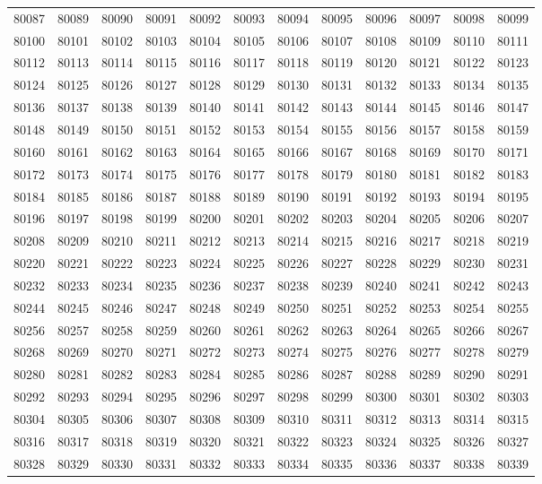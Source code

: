 \begin{center}
\begin{longtable}{llllllllllll}
80087 &80089 &80090 &80091 &80092 &80093 &80094 &80095 &80096 &80097 &80098 &80099 \\
80100 &80101 &80102 &80103 &80104 &80105 &80106 &80107 &80108 &80109 &80110 &80111 \\
80112 &80113 &80114 &80115 &80116 &80117 &80118 &80119 &80120 &80121 &80122 &80123 \\
80124 &80125 &80126 &80127 &80128 &80129 &80130 &80131 &80132 &80133 &80134 &80135 \\
80136 &80137 &80138 &80139 &80140 &80141 &80142 &80143 &80144 &80145 &80146 &80147 \\
80148 &80149 &80150 &80151 &80152 &80153 &80154 &80155 &80156 &80157 &80158 &80159 \\
80160 &80161 &80162 &80163 &80164 &80165 &80166 &80167 &80168 &80169 &80170 &80171 \\
80172 &80173 &80174 &80175 &80176 &80177 &80178 &80179 &80180 &80181 &80182 &80183 \\
80184 &80185 &80186 &80187 &80188 &80189 &80190 &80191 &80192 &80193 &80194 &80195 \\
80196 &80197 &80198 &80199 &80200 &80201 &80202 &80203 &80204 &80205 &80206 &80207 \\
80208 &80209 &80210 &80211 &80212 &80213 &80214 &80215 &80216 &80217 &80218 &80219 \\
80220 &80221 &80222 &80223 &80224 &80225 &80226 &80227 &80228 &80229 &80230 &80231 \\
80232 &80233 &80234 &80235 &80236 &80237 &80238 &80239 &80240 &80241 &80242 &80243 \\
80244 &80245 &80246 &80247 &80248 &80249 &80250 &80251 &80252 &80253 &80254 &80255 \\
80256 &80257 &80258 &80259 &80260 &80261 &80262 &80263 &80264 &80265 &80266 &80267 \\
80268 &80269 &80270 &80271 &80272 &80273 &80274 &80275 &80276 &80277 &80278 &80279 \\
80280 &80281 &80282 &80283 &80284 &80285 &80286 &80287 &80288 &80289 &80290 &80291 \\
80292 &80293 &80294 &80295 &80296 &80297 &80298 &80299 &80300 &80301 &80302 &80303 \\
80304 &80305 &80306 &80307 &80308 &80309 &80310 &80311 &80312 &80313 &80314 &80315 \\
80316 &80317 &80318 &80319 &80320 &80321 &80322 &80323 &80324 &80325 &80326 &80327 \\
80328 &80329 &80330 &80331 &80332 &80333 &80334 &80335 &80336 &80337 &80338 &80339 \\

\end{longtable}
\end{center}
